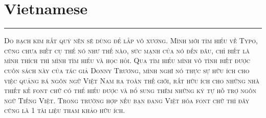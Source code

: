 \vspace{-1em}\section*{\checkno Vietnamese}
\vspace{-.5em}\hrule\vspace{.5em}
\noindent\textsc{
Do bạch kim rất quý nên sẽ dùng để lắp vô xương.
Mình mới tìm hiểu về Typo, cũng chưa biết cụ thể nó 
như thế nào, sức mạnh của nó đến đâu, chỉ biết là mình 
thích thì mình tìm hiểu và học hỏi. Qua tìm hiểu mình vô 
tình biết được cuốn sách này của tác giả Donny Trương, 
mình nghĩ nó thực sự hữu ích cho việc quảng bá ngôn ngữ 
Việt Nam ra toàn thế giới, rất hữu ích cho những nhà 
thiết kế font chữ có thể hiểu được và bổ sung thêm những 
ký tự hỗ trợ ngôn ngữ Tiếng Việt. Trong trường hợp nếu 
bạn đang Việt hóa font chữ thì đây cũng là 1 tài liệu 
tham khảo hữu ích.
}
